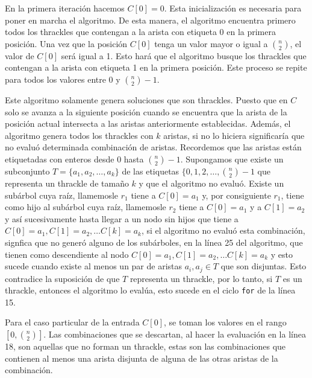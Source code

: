   En la primera iteración hacemos $C[0] = 0$. Esta inicialización es necesaria para poner
  en marcha el algoritmo. De esta manera, el algoritmo encuentra primero todos
  los thrackles que contengan a la arista con etiqueta 0 en la primera posición. Una vez que la posición $C[0]$ tenga un valor mayor o igual a $\binom{n}{2}$, el valor de
  $C[0]$ será igual a 1. Esto hará que el algoritmo busque los thrackles que
  contengan a la arista con etiqueta 1 en la primera posición. Este proceso se repite para todos los valores entre $0$ y $\binom{n}{2}-1$.

  Este algoritmo solamente genera soluciones que son thrackles.
  Puesto que en $C$ solo se avanza a la siguiente posición
  cuando se encuentra que la arista de la posición actual intersecta a las
  aristas anteriormente establecidas. Además, el algoritmo genera todos los
  thrackles con $k$ aristas, si no lo hiciera significaría que no evaluó
  determinada combinación de aristas. Recordemos que las aristas están etiquetadas
  con enteros desde $0$ hasta $\binom{n}{2}-1$. Supongamos que existe un subconjunto
  $T=\{a_1,a_2,\dots,a_k\}$ de las etiquetas $\{0,1,2,\dots,\binom{n}{2}-1$ que
  representa un thrackle de tamaño $k$ y que el algoritmo no evaluó. Existe un subárbol
  cuya raíz, llamemosle $r_1$ tiene a $C[0]=a_1$ y, por consiguiente $r_1$, tiene como
  hijo al subárbol cuya raíz, llamemosle $r_2$ tiene a $C[0]=a_1$ y a $C[1]=a_2$ y así
  sucesivamente hasta llegar a un nodo sin hijos que tiene a $C[0]=a_1,C[1]=a_2,\dots
  C[k]=a_k$, si el algoritmo no evaluó esta combinación, signfica que no generó alguno
  de los subárboles, en la línea 25 del algoritmo, que tienen como descendiente al nodo
  $C[0]=a_1,C[1]=a_2,\dots C[k]=a_k$ y esto sucede cuando existe al menos un par de
  aristas $a_i,a_j\in T$ que son  disjuntas. Esto contradice la suposición de que $T$
  representa un thrackle, por lo tanto, si $T$ es un thrackle, entonces el algoritmo lo
  evalúa, esto sucede en el ciclo \texttt{for} de la línea 15.

  Para el caso particular de la entrada $C[0]$, se toman los valores en el rango $\left[ 0, \binom{n}{2}\right]$. Las combinaciones que se descartan, al hacer la evaluación en la línea 18, son aquellas que no forman un thrackle, estas son las combinaciones que contienen al menos una arista disjunta de alguna de las otras aristas de la combinación.

